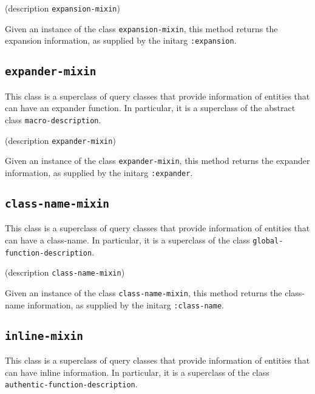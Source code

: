 
 {(description {\tt expansion-mixin})}

Given an instance of the class \texttt{expansion-mixin}, this method
returns the expansion information, as supplied by the initarg
\texttt{:expansion}.

\subsection{\texttt{expander-mixin}}
\label{sec-expander-mixin}

This class is a superclass of query classes that provide information
of entities that can have an expander function.  In particular, it is
a superclass of the abstract class \texttt{macro-description}.


 {(description {\tt expander-mixin})}

Given an instance of the class \texttt{expander-mixin}, this method
returns the expander information, as supplied by the initarg
\texttt{:expander}.

\subsection{\texttt{class-name-mixin}}
\label{sec-class-name-mixin}

This class is a superclass of query classes that provide information
of entities that can have a class-name.  In particular, it is a
superclass of the class \texttt{global-function-description}.


 {(description {\tt class-name-mixin})}

Given an instance of the class \texttt{class-name-mixin}, this method
returns the class-name information, as supplied by the initarg
\texttt{:class-name}.

\subsection{\texttt{inline-mixin}}
\label{sec-inline-mixin}

This class is a superclass of query classes that provide information
of entities that can have inline information.  In particular, it is a
superclass of the class \texttt{authentic-function-description}.

